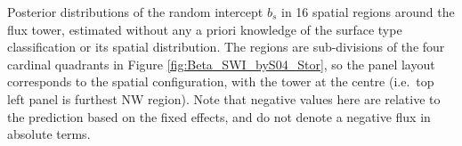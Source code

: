 \label{fig:b_Fch4_U1S16_byS_Stor} Posterior distributions of
the random intercept \(b_{s}\) in 16 spatial regions around the flux
tower, estimated without any a priori knowledge of the surface type
classification or its spatial distribution. The regions are
sub-divisions of the four cardinal quadrants in Figure
\ref{fig:Beta_SWI_byS04_Stor}, so the panel layout corresponds to the
spatial configuration, with the tower at the centre (i.e.~top left panel
is furthest NW region). Note that negative values here are relative to
the prediction based on the fixed effects, and do not denote a negative
flux in absolute terms.